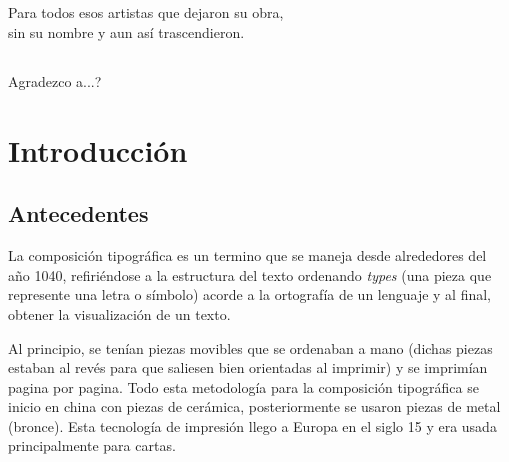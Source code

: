\documentclass[12pt,letterpaper,titlepage,oneside,openright]{book}
\begin{document}
\newpage
 
\section*{} %
\begin{flushright}
Para todos esos artistas que dejaron su obra, \\ sin su nombre y aun así trascendieron.
\end{flushright}

\newpage

\section*{} %
\begin{flushleft}
Agradezco a...?
\end{flushleft}

\newpage

\tableofcontents

\mainmatter



 
 


\chapter{Introducción}
\section{Antecedentes}
La composición tipográfica es un termino que se maneja desde alrededores del año 1040, refiriéndose
a la estructura del texto ordenando \textit{types} (una pieza que represente una letra o
símbolo) acorde a la ortografía de un lenguaje y al final, obtener la visualización de un texto.

Al principio, se tenían piezas movibles que se ordenaban a mano (dichas piezas estaban al revés 
para que saliesen bien orientadas al imprimir) y se imprimían pagina por pagina. Todo esta 
metodología para la composición tipográfica se inicio en china con piezas de cerámica, 
posteriormente se usaron piezas de metal (bronce). Esta tecnología de impresión llego a Europa
en el siglo 15 y era usada principalmente para cartas.
\end{document}

